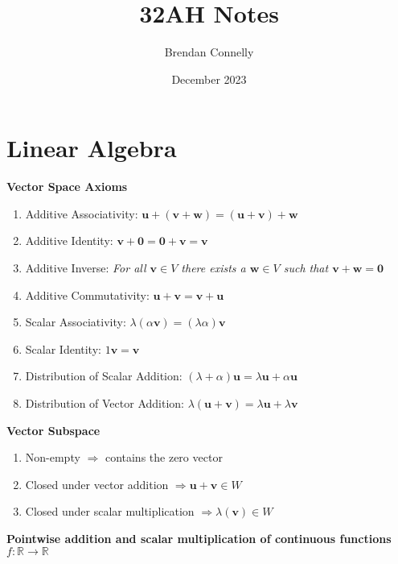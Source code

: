 \documentclass{article}
\title{32AH Notes}
\author{Brendan Connelly}
\date{December 2023}
\newcommand{\R}{\mathbb{R}}
\begin{document}
\maketitle

\section*{Linear Algebra}

\textbf{Vector Space Axioms}

\begin{enumerate}
    \renewcommand{\labelenumi}{\roman{enumi}}
    \item Additive Associativity: $\bm{u} + (\bm{v} + \bm{w}) = (\bm{u} + \bm{v}) + \bm{w}$
    \item Additive Identity: $\bm{v} + \bm{0} = \bm{0} + \bm{v} = \bm{v}$
    \item Additive Inverse: \textit{For all $\bm{v} \in V$ there exists a  $\bm{w} \in V$ such that $\bm{v} + \bm{w} = \bm{0}$}
    \item Additive Commutativity: $\bm{u} + \bm{v} = \bm{v} + \bm{u}$
    \item Scalar Associativity: $\lambda \left(\alpha \bm{v} \right) = \left(\lambda \alpha \right) \bm{v}$
    \item Scalar Identity: $1\bm{v} = \bm{v}$
    \item Distribution of Scalar Addition: $\left( \lambda + \alpha \right) \bm{u} = \lambda \bm{u} + \alpha \bm{u}$
    \item Distribution of Vector Addition: $\lambda \left( \bm{u} + \bm{v} \right) = \lambda \bm{u} + \lambda \bm{v}$
\end{enumerate}

\vspace{0.5cm}

\noindent \textbf{Vector Subspace}

\begin{enumerate}
    \renewcommand{\labelenumi}{\roman{enumi}}
    \item Non-empty $\Rightarrow$ contains the zero vector
    \item Closed under vector addition $\Rightarrow \bm{u} + \bm{v} \in W$
    \item Closed under scalar multiplication $\Rightarrow \lambda (\bm{v}) \in W$
\end{enumerate}

\vspace{0.5cm}

\noindent \textbf{Pointwise addition and scalar multiplication of continuous functions $f: \R \to \R$}
\end{document}
